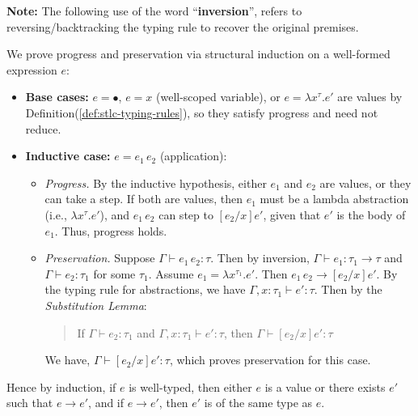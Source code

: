     \newpage 

\begin{Note}
\textbf{Note:} The following use of the word ``\textbf{inversion}'', refers to reversing/backtracking the typing rule to recover the original premises.
\end{Note}

\vspace{-.5em}
\begin{Proof}

    We prove progress and preservation via structural induction on a well-formed expression $e$:
    \begin{itemize}
        \item \textbf{Base cases:} $e = \bullet$, $e = x$ (well-scoped variable), or $e = \lambda x^{\tau}. e'$ are values by Definition(\ref{def:stlc-typing-rules}), so they satisfy progress and need not reduce.

        \item \textbf{Inductive case:} $e = e_1\, e_2$ (application):

        \begin{itemize}
            \item \emph{Progress.} By the inductive hypothesis, either $e_1$ and $e_2$ are values, or they can take a step. 
            If both are values, then $e_1$ must be a lambda abstraction (i.e., $\lambda x^{\tau}. e'$), and $e_1\, e_2$ can step to $[e_2 / x]e'$, given that $e'$ is the body of $e_1$. Thus, progress holds.

            \item \emph{Preservation.} Suppose $\Gamma \vdash e_1\, e_2 : \tau$. Then by inversion, $\Gamma \vdash e_1 : \tau_1 \to \tau$ and $\Gamma \vdash e_2 : \tau_1$ for some $\tau_1$. Assume $e_1 = \lambda x^{\tau_1}. e'$. Then $e_1\, e_2 \rightarrow [e_2/x]e'$. By the typing rule for abstractions, we have $\Gamma, x : \tau_1 \vdash e' : \tau$. Then by the \emph{Substitution Lemma}:

            \begin{quote}
                If $\Gamma \vdash e_2 : \tau_1$ and $\Gamma, x:\tau_1 \vdash e' : \tau$, then $\Gamma \vdash [e_2/x]e' : \tau$
            \end{quote}

            We have, $\Gamma \vdash [e_2/x]e' : \tau$, which proves preservation for this case.
        \end{itemize}
    \end{itemize}

    \noindent
    Hence by induction, if $e$ is well-typed, then either $e$ is a value or there exists $e'$ such that $e \rightarrow e'$, and if $e \rightarrow e'$, then $e'$ is of the same type as $e$.
\end{Proof}

